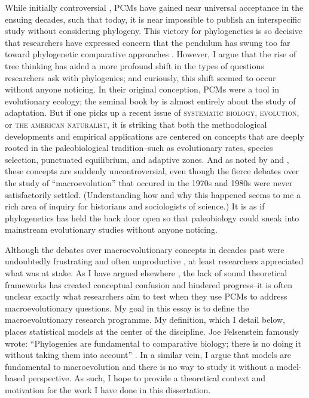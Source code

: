 While initially controversial \citep[e.g.,][]{Westoby1995}, PCMs have gained near universal acceptance in the ensuing decades, such that today, it is near impossible to publish an interspecific study without considering phylogeny. This victory for phylogenetics is so decisive that researchers have expressed concern that the pendulum has swung too far toward phylogenetic comparative approaches \citep{WeberTREE, Losos2011}. However, I argue that the rise of tree thinking has aided a more profound shift in the types of questions researchers ask with phylogenies; and curiously, this shift seemed to occur without anyone noticing. In their original conception, PCMs were a tool in evolutionary ecology; the seminal book by \citet{HarveyPagel1991} is almost entirely about the study of adaptation. But if one picks up a recent issue of \textsc{systematic biology}, \textsc{evolution}, or \textsc{the american naturalist}, it is striking that both the methodological developments and empirical applications are centered on concepts that are deeply rooted in the paleobiological tradition--such as evolutionary rates, species selection, punctuated equilibrium, and adaptive zones. And as noted by \citet{FitzJohnthesis} and \citet{PennellPE}, these concepts are suddenly uncontroversial, even though the fierce debates over the study of ``macroevolution'' that occured in the 1970s and 1980s \citep{Stanley1975, Gould1980, Charlesworth1982} were never satisfactorily settled. (Understanding how and why this happened seems to me a rich area of inquiry for historians and sociologists of science.) It is as if phylogenetics has held the back door open so that paleobiology could sneak into mainstream evolutionary studies without anyone noticing.

Although the debates over macroevolutionary concepts in decades past were undoubtedly frustrating and often unproductive \citep[for example, see][]{Levinton2001, Gould2002}, at least researchers appreciated what was at stake. As I have argued elsewhere \citep{PennellPE, Pennellpcmbook}, the lack of sound theoretical frameworks has created conceptual confusion and hindered progress--it is often unclear exactly what researchers aim to test when they use PCMs to address macroevolutionary questions. My goal in this essay is to define the macroevolutionary research programme. My definition, which I detail below, places statistical models at the center of the discipline. Joe Felsenstein famously wrote: ``Phylogenies are fundamental to comparative biology; there is no doing it without taking them into account'' \citep[][p. 14]{Felsenstein1985}. In a similar vein, I argue that models are fundamental to macroevolution and there is no way to study it without a model-based perspective. As such, I hope to provide a theoretical context and motivation for the work I have done in this dissertation.

